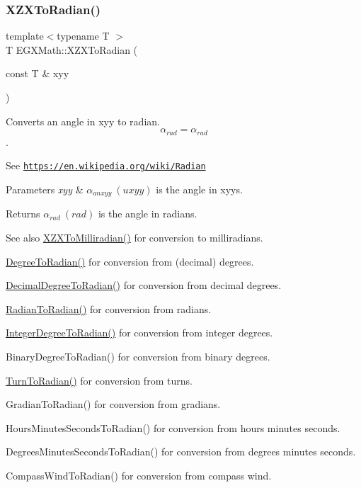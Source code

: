 \subsubsection{\texorpdfstring{X\+Z\+X\+To\+Radian()}{XZXToRadian()}}
{\footnotesize\ttfamily template$<$typename T $>$ \\
T E\+G\+X\+Math\+::\+X\+Z\+X\+To\+Radian (\begin{DoxyParamCaption}\item[{const T \&}]{xyy }\end{DoxyParamCaption})}



Converts an angle in xyy to radian. \[\alpha_{rad}=\alpha_{rad}\]. 

See \href{https://en.wikipedia.org/wiki/Radian}{\tt https\+://en.\+wikipedia.\+org/wiki/\+Radian} 
\begin{DoxyParams}{Parameters}
{\em xyy} & $\alpha_{anxyy}\ (uxyy)$ is the angle in xyys. \\
\hline
\end{DoxyParams}
\begin{DoxyReturn}{Returns}
$\alpha_{rad}\ (rad)$ is the angle in radians. 
\end{DoxyReturn}
\begin{DoxySeeAlso}{See also}
\mbox{\hyperlink{group___e_g_x_math-_angle_conversions-_x_z_x_gadbd00eddee5bd9ee313fabb1a9d3ff3c}{X\+Z\+X\+To\+Milliradian()}} for conversion to milliradians. 

\mbox{\hyperlink{group___e_g_x_math-_angle_conversions-_degree_ga48585541b228c852c9d08a9eac3682f0}{Degree\+To\+Radian()}} for conversion from (decimal) degrees. 

\mbox{\hyperlink{group___e_g_x_math-_angle_conversions-_decimal_degree_ga906ee2c83cdf4caa59eb613dc2d5d52a}{Decimal\+Degree\+To\+Radian()}} for conversion from decimal degrees. 

\mbox{\hyperlink{group___e_g_x_math-_angle_conversions-_radian_gae08681bd86b8e7e4325f6c8cb3a0dc37}{Radian\+To\+Radian()}} for conversion from radians. 

\mbox{\hyperlink{group___e_g_x_math-_angle_conversions-_integer_degree_ga05d3368b00ea27b9895de2ffe5c8df38}{Integer\+Degree\+To\+Radian()}} for conversion from integer degrees. 

Binary\+Degree\+To\+Radian() for conversion from binary degrees. 

\mbox{\hyperlink{group___e_g_x_math-_angle_conversions-_turn_ga72e6d3c46ebfc25f7be5050136d8df16}{Turn\+To\+Radian()}} for conversion from turns. 

Gradian\+To\+Radian() for conversion from gradians. 

Hours\+Minutes\+Seconds\+To\+Radian() for conversion from hours minutes seconds. 

Degrees\+Minutes\+Seconds\+To\+Radian() for conversion from degrees minutes seconds. 

Compass\+Wind\+To\+Radian() for conversion from compass wind. 
\end{DoxySeeAlso}
